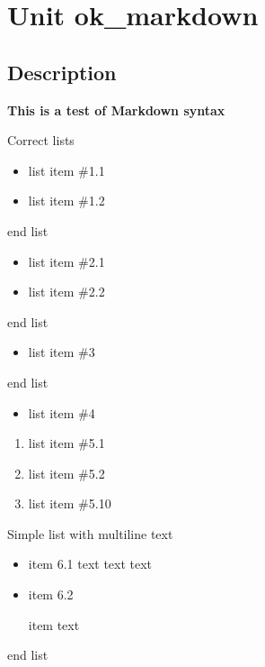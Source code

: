 \documentclass{report}
\begin{document}
\label{toc}\tableofcontents
\newpage
\newlength{\tmplength}
\chapter{Unit ok{\_}markdown}
\label{ok_markdown}
\section{Description}
\textbf{This is a test of Markdown syntax}\hfill\vspace*{1ex}

 Correct lists

\begin{itemize}
\item list item {\#}1.1
\item list item {\#}1.2
\end{itemize}end list

\begin{itemize}
\item list item {\#}2.1
\item list item {\#}2.2
\end{itemize}end list

\begin{itemize}
\item list item {\#}3
\end{itemize}end list

\begin{itemize}
\item list item {\#}4
\end{itemize}\begin{enumerate}
\setcounter{enumi}{0} \setcounter{enumii}{0} \setcounter{enumiii}{0} \setcounter{enumiv}{0} 
\item list item {\#}5.1
\setcounter{enumi}{1} \setcounter{enumii}{1} \setcounter{enumiii}{1} \setcounter{enumiv}{1} 
\item list item {\#}5.2
\setcounter{enumi}{2} \setcounter{enumii}{2} \setcounter{enumiii}{2} \setcounter{enumiv}{2} 
\item list item {\#}5.10
\end{enumerate}Simple list with multiline text

\begin{itemize}
\item item 6.1 text text text
\item item 6.2

item text
\end{itemize}end list
\end{document}
